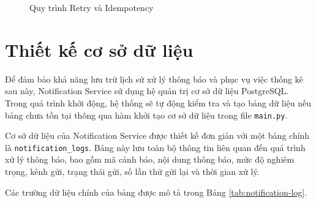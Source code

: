 \begin{figure}[H]
\centering
{}
\caption{Quy trình Retry và Idempotency}
\label{fig:retry-idempotency}
\end{figure}

\section{Thiết kế cơ sở dữ liệu}

Để đảm bảo khả năng lưu trữ lịch sử xử lý thông báo và phục vụ việc thống kê sau này, Notification Service sử dụng hệ quản trị cơ sở dữ liệu PostgreSQL. Trong quá trình khởi động, hệ thống sẽ tự động kiểm tra và tạo bảng dữ liệu nếu bảng chưa tồn tại thông qua hàm khởi tạo cơ sở dữ liệu trong file \texttt{main.py}.

Cơ sở dữ liệu của Notification Service được thiết kế đơn giản với một bảng chính là \texttt{notification\_logs}. Bảng này lưu toàn bộ thông tin liên quan đến quá trình xử lý thông báo, bao gồm mã cảnh báo, nội dung thông báo, mức độ nghiêm trọng, kênh gửi, trạng thái gửi, số lần thử gửi lại và thời gian xử lý.

Các trường dữ liệu chính của bảng được mô tả trong Bảng \ref{tab:notification-log}.

